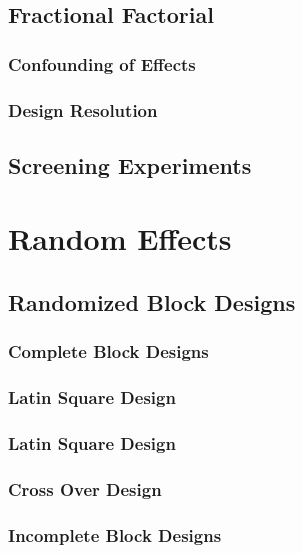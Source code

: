 \subsection{Fractional Factorial}

\subsubsection{Confounding of Effects}

\subsubsection{Design Resolution}


\subsection{Screening Experiments}

\section{Random Effects}

\subsection{Randomized Block Designs}

\subsubsection{Complete Block Designs}


\subsubsection{Latin Square Design}

\subsubsection{Latin Square Design}

\subsubsection{Cross Over Design}

\subsubsection{Incomplete Block Designs}


